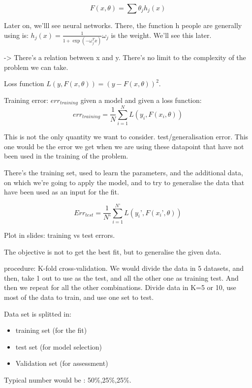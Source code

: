 \documentclass[a4paper]{tufte-book}
\begin{document}
\begin{equation}
F(x, \theta) = \sum \theta_j h_j(x)
\end{equation}

Later on, we’lll see neural networks. There, the function h people are generally using is:
$h_j(x) = \frac{1}{1 + \exp (-\omega_j^T x )} \omega_j$ is the weight. We’ll see this later.

-> There’s a relation between x and y.
There’s no limit to the complexity of the problem we can take.

Loss function $L (y, F(x, \theta)) = (y-F(x,\theta))^2$.

Training error: $err_{training}$ given a model and given a loss function:
\begin{equation}
err_{training} = \frac{1}{N} \sum_{i=1}^N L (y_i, F(x_i,\theta))
\end{equation}

This is not the only quantity we want to consider.
test/generalisation error. This one would be the error we get when we are using these datapoint that have not been used in the training of the problem.

There’s the training set, used to learn the parameters, and the additional data, on which we’re going to apply the model, and to try to generalise the data that have been used as an input for the fit.

\begin{equation}
Err_{test} = \frac{1}{N’} \sum_{i=1}^{N’} L(y_i’,F(x_i’,\theta))
\end{equation}

Plot in slides: training vs test errors.

The objective is not to get the best fit, but to generalise the given data.

procedure: K-fold cross-validation. 
We would divide the data in 5 datasets, and then, take 1 out to use as the test, and all the other one as training test. 
And then we repeat for all the other combinations. Divide data in K=5 or 10, use most of the data to train, and use one set to test.

Data set is splitted in:
\begin{itemize}
\item training set (for the fit)
\item test set (for model selection)
\item Validation set (for assessment)
\end{itemize}

Typical number would be : 50\%,25\%,25\%.
\end{document}
